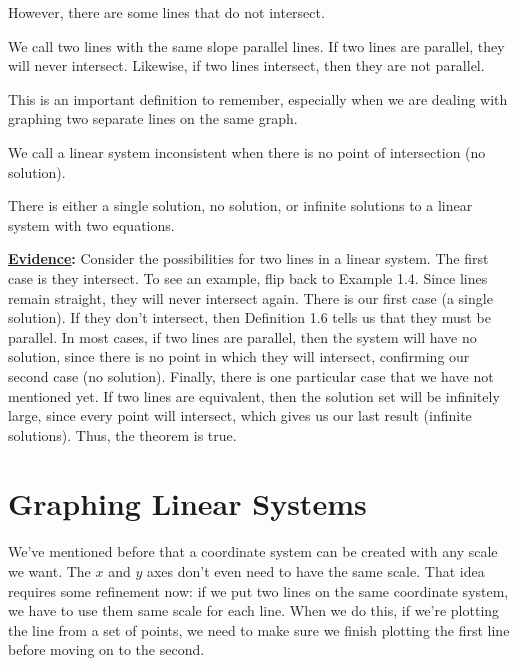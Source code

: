 However, there are some lines that do not intersect.

\begin{defn}
We call two lines with the same slope parallel lines. If two lines are parallel, they will never intersect. Likewise, if two lines intersect, then they are not parallel. 	
\end{defn}
This is an important definition to remember, especially when we are dealing with graphing two separate lines on the same graph.

\begin{defn}
We call a linear system inconsistent when there is no point of intersection (no solution).	
\end{defn}
\begin{theorem}
There is either a single solution, no solution, or infinite solutions to a linear system with two equations. 	
\end{theorem}

\noindent
\textbf{\underline{Evidence}:} Consider the possibilities for two lines in a linear system. The first case is they intersect. To see an example, flip back to Example 1.4. Since lines remain straight, they will never intersect again. There is our first case (a single solution). If they don't intersect, then Definition 1.6 tells us that they must be parallel. In most cases, if two lines are parallel, then the system will have no solution, since there is no point in which they will intersect, confirming our second case (no solution). Finally, there is one particular case that we have not mentioned yet. If two lines are equivalent, then the solution set will be infinitely large, since every point will intersect, which gives us our last result (infinite solutions). Thus, the theorem is true. 
\pagebreak

\section{Graphing Linear Systems}

We've mentioned before that a coordinate system can be created with any scale we want.  The $x$ and $y$ axes don't even need to have the same scale.  That idea requires some refinement now: if we put two lines on the same coordinate system, we have to use them same scale for each line.  When we do this, if we're plotting the line from a set of points, we need to make sure we finish plotting the first line before moving on to the second.

